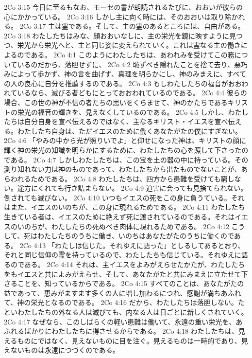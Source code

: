 2Co 3:15  今日に至るもなお、モーセの書が朗読されるたびに、おおいが彼らの心にかかっている。
2Co 3:16  しかし主に向く時には、そのおおいは取り除かれる。
2Co 3:17  主は霊である。そして、主の霊のあるところには、自由がある。
2Co 3:18  わたしたちはみな、顔おおいなしに、主の栄光を鏡に映すように見つつ、栄光から栄光へと、主と同じ姿に変えられていく。これは霊なる主の働きによるのである。
2Co 4:1  このようにわたしたちは、あわれみを受けてこの務についているのだから、落胆せずに、
2Co 4:2  恥ずべき隠れたことを捨て去り、悪巧みによって歩かず、神の言を曲げず、真理を明らかにし、神のみまえに、すべての人の良心に自分を推薦するのである。
2Co 4:3  もしわたしたちの福音がおおわれているなら、滅びる者どもにとっておおわれているのである。
2Co 4:4  彼らの場合、この世の神が不信の者たちの思いをくらませて、神のかたちであるキリストの栄光の福音の輝きを、見えなくしているのである。
2Co 4:5  しかし、わたしたちは自分自身を宣べ伝えるのではなく、主なるキリスト・イエスを宣べ伝える。わたしたち自身は、ただイエスのために働くあなたがたの僕にすぎない。
2Co 4:6  「やみの中から光が照りいでよ」と仰せになった神は、キリストの顔に輝く神の栄光の知識を明らかにするために、わたしたちの心を照して下さったのである。
2Co 4:7  しかしわたしたちは、この宝を土の器の中に持っている。その測り知れない力は神のものであって、わたしたちから出たものでないことが、あらわれるためである。
2Co 4:8  わたしたちは、四方から患難を受けても窮しない。途方にくれても行き詰まらない。
2Co 4:9  迫害に会っても見捨てられない。倒されても滅びない。
2Co 4:10  いつもイエスの死をこの身に負うている。それはまた、イエスのいのちが、この身に現れるためである。
2Co 4:11  わたしたち生きている者は、イエスのために絶えず死に渡されているのである。それはイエスのいのちが、わたしたちの死ぬべき肉体に現れるためである。
2Co 4:12  こうして、死はわたしたちのうちに働き、いのちはあなたがたのうちに働くのである。
2Co 4:13  「わたしは信じた。それゆえに語った」としるしてあるとおり、それと同じ信仰の霊を持っているので、わたしたちも信じている。それゆえに語るのである。
2Co 4:14  それは、主イエスをよみがえらせたかたが、わたしたちをもイエスと共によみがえらせ、そして、あなたがたと共にみまえに立たせて下さることを、知っているからである。
2Co 4:15  すべてのことは、あなたがたの益であって、恵みがますます多くの人に増し加わるにつれ、感謝が満ちあふれて、神の栄光となるのである。
2Co 4:16  だから、わたしたちは落胆しない。たといわたしたちの外なる人は滅びても、内なる人は日ごとに新しくされていく。
2Co 4:17  なぜなら、このしばらくの軽い患難は働いて、永遠の重い栄光を、あふれるばかりにわたしたちに得させるからである。
2Co 4:18  わたしたちは、見えるものにではなく、見えないものに目を注ぐ。見えるものは一時的であり、見えないものは永遠につづくのである。
